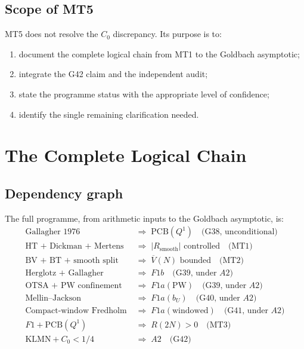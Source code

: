 \documentclass[11pt,a4paper]{article}
\begin{document}
\subsection{Scope of MT5}

MT5 does not resolve the $C_0$ discrepancy.  Its purpose is to:
\begin{enumerate}[nosep]
    \item document the complete logical chain from MT1 to the Goldbach asymptotic;
    \item integrate the G42 claim and the independent audit;
    \item state the programme status with the appropriate level of confidence;
    \item identify the single remaining clarification needed.
\end{enumerate}

\section{The Complete Logical Chain}

\subsection{Dependency graph}

The full programme, from arithmetic inputs to the Goldbach asymptotic, is:
\begin{align*}
\text{Gallagher 1976} &\;\Longrightarrow\; \text{PCB}(Q^1) \quad\text{(G38, unconditional)} \\
\text{HT + Dickman + Mertens} &\;\Longrightarrow\; |R_{\text{smooth}}| \text{ controlled} \quad\text{(MT1)} \\
\text{BV + BT + smooth split} &\;\Longrightarrow\; \overline{V}(N) \text{ bounded} \quad\text{(MT2)} \\
\text{Herglotz + Gallagher} &\;\Longrightarrow\; F1b \quad\text{(G39, under }A2\text{)} \\
\text{OTSA + PW confinement} &\;\Longrightarrow\; F1a(\text{PW}) \quad\text{(G39, under }A2\text{)} \\
\text{Mellin--Jackson} &\;\Longrightarrow\; F1a(b_U) \quad\text{(G40, under }A2\text{)} \\
\text{Compact-window Fredholm} &\;\Longrightarrow\; F1a(\text{windowed}) \quad\text{(G41, under }A2\text{)} \\
F1 + \text{PCB}(Q^1) &\;\Longrightarrow\; R(2N)>0 \quad\text{(MT3)} \\
\text{KLMN} + C_0 < 1/4 &\;\Longrightarrow\; A2 \quad\text{(G42)}
\end{align*}
\end{document}
